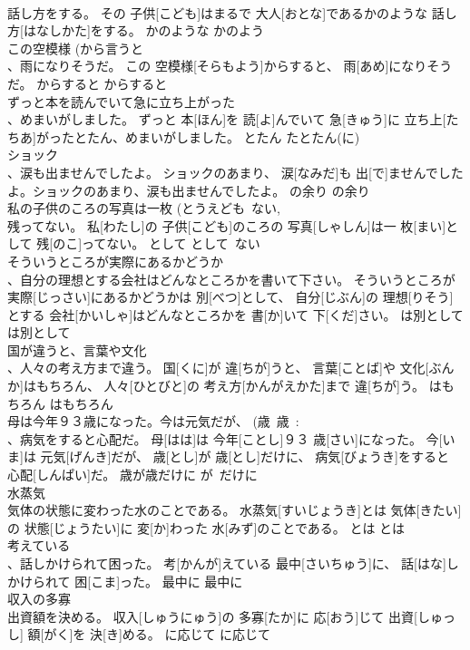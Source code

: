 \documentclass[8pt]{extreport}
\begin{document}
\begin{CJK}{UTF8}{min}
\\	話し方をする。	その 子供[こども]はまるで 大人[おとな]であるかのような 話し方[はなしかた]をする。	かのような	かのよう	
\\	この空模様 (から言うと 
\\	、雨になりそうだ。	この 空模様[そらもよう]からすると、 雨[あめ]になりそうだ。	からすると	からすると	
\\	ずっと本を読んでいて急に立ち上がった 
\\	、めまいがしました。	ずっと 本[ほん]を 読[よ]んでいて 急[きゅう]に 立ち上[たちあ]がったとたん、めまいがしました。	とたん	たとたん(に)	
\\	ショック 
\\	、涙も出ませんでしたよ。	ショックのあまり、 涙[なみだ]も 出[で]ませんでしたよ。ショックのあまり、涙も出ませんでしたよ。	の余り	の余り	
\\	私の子供のころの写真は一枚 (とうえども~ない, 
\\	残ってない。	私[わたし]の 子供[こども]のころの 写真[しゃしん]は一 枚[まい]として 残[のこ]ってない。	として	として~ない	
\\	そういうところが実際にあるかどうか 
\\	、自分の理想とする会社はどんなところかを書いて下さい。	そういうところが 実際[じっさい]にあるかどうかは 別[べつ]として、 自分[じぶん]の 理想[りそう]とする 会社[かいしゃ]はどんなところかを 書[か]いて 下[くだ]さい。	は別として	は別として	
\\	国が違うと、言葉や文化 
\\	、人々の考え方まで違う。	国[くに]が 違[ちが]うと、 言葉[ことば]や 文化[ぶんか]はもちろん、 人々[ひとびと]の 考え方[かんがえかた]まで 違[ちが]う。	はもちろん	はもちろん	
\\	母は今年９３歳になった。今は元気だが、 (歳~歳~: 
\\	、病気をすると心配だ。	母[はは]は 今年[ことし]９３ 歳[さい]になった。 今[いま]は 元気[げんき]だが、 歳[とし]が 歳[とし]だけに、 病気[びょうき]をすると 心配[しんぱい]だ。	歳が歳だけに	が~だけに	
\\	水蒸気 
\\	気体の状態に変わった水のことである。	水蒸気[すいじょうき]とは 気体[きたい]の 状態[じょうたい]に 変[か]わった 水[みず]のことである。	とは	とは	
\\	考えている 
\\	、話しかけられて困った。	考[かんが]えている 最中[さいちゅう]に、 話[はな]しかけられて 困[こま]った。	最中に	最中に	
\\	収入の多寡 
\\	出資額を決める。	収入[しゅうにゅう]の 多寡[たか]に 応[おう]じて 出資[しゅっし] 額[がく]を 決[き]める。	に応じて	に応じて	

\end{CJK}
\end{document}
